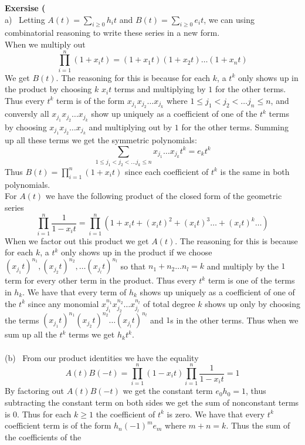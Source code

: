 \documentclass[12pt]{article}
\newenvironment{ques}[1]{\textbf{Exersise #1}\vspace{1 mm}\\ }{\bigskip}
\theoremstyle{definition}
\renewcommand{\l}{\left }
\renewcommand{\r}{\right }
\begin{document}
\begin{ques}{9.5}
	(a) \ Letting $A(t) = \sum_{i \geq 0} h_it$ and $B(t) =  \sum_{i \geq 0}
	e_it$, we can using combinatorial reasoning to write these series in a new
	form.\\
	When we multiply out 
	$$\prod_{i = 1}^n (1 + x_it) = (1 + x_1t)(1 + x_2t) \dots (1 + x_nt) $$
	We get $B(t)$. The reasoning for this is because for each $k$, a $t^k$ only
	shows up in the product by choosing $k$ $x_it$ terms and multiplying by $1$
	for the other terms. Thus every $t^k$ term is of the form $x_{j_1}x_{j_2}
	\dots x_{j_k}$ where $1\leq j_1 < j_2 < \dots j_n \leq n$, and conversly
	all $x_{j_1}x_{j_2} \dots x_{j_k}$ show up uniquely as a coefficient of one
	of the $t^k$ terms by choosing $x_{j_1}x_{j_2} \dots x_{j_k}$ and
	multiplying out by $1$ for the other terms. Summing up all these terms we
	get the symmetric polynomials:
	$$\sum_{1 \leq j_1 < j_2 < \dots j_k \leq n} x_{j_1} \dots x_{j_k}t^k = e_kt^k$$
	Thus $B(t) = \prod_{i = 1}^n (1 + x_it)$ since each coefficient of $t^k$ is
	the same in both polynomials.\\
	For $A(t)$ we have the following product of the closed form of the
	geometric series
	$$\prod_{i = 1}^n \frac1{ 1 - x_it } = \prod_{i = 1}^n\l(1 + x_it +
	(x_it)^2 + (x_it)^3 \dots + (x_it)^k \dots \r)$$
	When we factor out this product we get $A(t)$. The reasoning for this is
	because for each $k$, a $t^k$ only shows up in the product if we choose
	$(x_{j_1}t)^{n_1}, (x_{j_2}t)^{n_2}, \dots (x_{j_l}t)^{n_l}$ so that $n_1 +
	n_2 \dots n_l = k$ and multiply by the $1$ term for every other
	term in the product. Thus every $t^k$ term is one of the terms in $h_k$. We
	have that every term of $h_k$ shows up uniquely as a coefficient of one of
	the $t^k$ since any monomial $x_{j_1}^{n_1}x_{j_2}^{n_2}\dots
	x_{j_l}^{n_l}$ of total degree $k$ shows up only by choosing the terms
	$(x_{j_1}t)^{n_1}(x_{j_2}t)^{n_2}\dots (x_{j_l}t)^{n_l}$ and $1$s in the
	other terms. Thus when we sum up all the $t^k$ terms we get $h_kt^k$.\\
	\\
	(b) \ From our product identities we have the equality
	$$A(t)B(-t) = \prod_{i = 1}^n (1 - x_it)\prod_{i = 1}^n \frac1{ 1 - x_it } = 1$$
	By factoring out $A(t)B(-t)$ we get the constant term $e_0h_0 = 1$, thus
	subtracting the constant term on both sides we get the sum of nonconstant
	terms is $0$. Thus for each $k \geq 1$ the coefficient of $t^k$ is zero. We
	have that every $t^k$ coefficient term is of the form
	$h_n(-1)^me_m$ where $m + n = k$.  Thus the sum of the coefficients of the

\end{ques}
\end{document}
